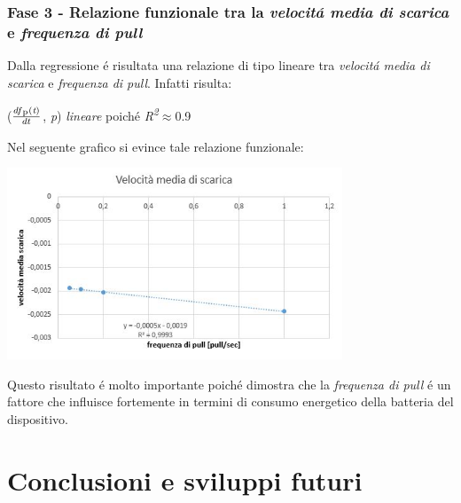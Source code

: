 \documentclass{article}
\begin{document}
\subsubsection{Fase 3 - Relazione funzionale tra la \textit{velocit\'a media di scarica} e \textit{frequenza di pull}}
Dalla regressione \'e risultata una relazione di tipo lineare tra \textit{velocit\'a media di scarica} e \textit{frequenza di pull}. Infatti risulta: 

\begin{center}
\item{(\(\frac{df\textsubscript{p}(\textit{t})}{dt}\), \textit{p})  \textit{lineare} poich\'e \textit{R\textsuperscript{2}}\(\approx\)0.9} 
\end{center}

Nel seguente grafico si evince tale relazione funzionale:

\begin{center}
\includegraphics[width=0.75\textwidth]{veloc.jpg} %
\label{fig:Relazione funzionale}
\end{center}

Questo risultato \'e molto importante poich\'e dimostra che la \textit{frequenza di pull} \'e un fattore che influisce fortemente in termini di consumo energetico della batteria del dispositivo.

\section{Conclusioni e sviluppi futuri}



%
\end{document}
